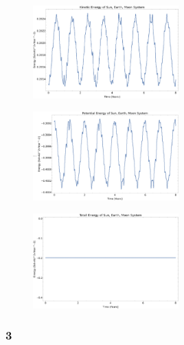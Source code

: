 \documentclass{article}
\begin{document}
\begin{figure}[!htb]
	\begin{center}
		\includegraphics[width=0.5\textwidth]{p1-2d.pdf}
	\end{center}
	\caption{}
\label{fig:qual}
\end{figure}
\FloatBarrier


\begin{figure}[!htb]
	\begin{center}
		\includegraphics[width=0.5\textwidth]{p1-2e.pdf}
	\end{center}
	\caption{}
\label{fig:qual}
\end{figure}
\FloatBarrier


\begin{figure}[!htb]
	\begin{center}
		\includegraphics[width=0.5\textwidth]{p1-2f.pdf}
	\end{center}
	\caption{}
\label{fig:qual}
\end{figure}
\FloatBarrier

\subsubsection{3}
\end{document}
